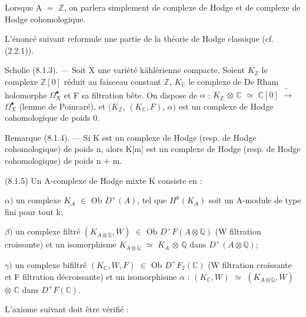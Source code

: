 \documentclass[11pt,twoside]{article}
\begin{document}
Lorsque A \(=\) \(\mathbb{Z}\), on parlera simplement de complexe de Hodge et de complexe de Hodge cohomologique.\par
\par\medskip
L’énoncé suivant reformule une partie de la théorie de Hodge classique (cf. (2.2.1)).\par
\par\medskip
Scholie (8.1.3). — Soit X une variété kählérienne compacte. Soient \(K_{\mathbb{Z}}\) le complexe \(\mathbb{Z}[0]\) réduit au faisceau constant \(\mathbb{Z}\), \(K_{\mathbb{C}}\) le complexe de De Rham holomorphe \(\Omega _{X}^{\bullet }\) et F sa filtration bête. On dispose de \(\alpha \) : \(K_{\mathbb{Z}}\) \(\otimes \) \(\mathbb{C}\) \(\simeq \) \(\mathbb{C}[0]\) \(\widetilde{\to }\) \(\Omega _{X}^{\bullet }\) (lemme de Poincaré), et \((K_{\mathbb{Z}}\), \((K_{\mathbb{C}},F)\), \(\alpha )\) est un complexe de Hodge cohomologique de poids 0.\par
\par\medskip
Remarque (8.1.4). — Si K est un complexe de Hodge (resp. de Hodge cohomologique) de poids n, alors K[m] est un complexe de Hodge (resp. de Hodge cohomologique) de poids n \(+\) m.\par
\par\medskip
(8.1.5) Un A-complexe de Hodge mixte K consiste en :\par
\par\medskip
\(\alpha )\) un complexe \(K_{A}\) \(\in \) Ob \(D^{+}(A)\), tel que \(H^{k}(K_{A})\) soit un A-module de type fini pour tout k;\par
\par\medskip
\(\beta )\) un complexe filtré \((K_{A\otimes \mathbb{Q}},W)\) \(\in \) Ob \(D^{+}F(A\otimes \mathbb{Q})\) (W filtration croissante) et un isomorphisme \(K_{A\otimes \mathbb{Q}}\) \(\simeq \) \(K_{A}\) \(\otimes \) \(\mathbb{Q}\) dans \(D^{+}(A\otimes \mathbb{Q})\);\par
\par\medskip
\(\gamma )\) un complexe bifiltré \((K_{\mathbb{C}},W,F)\) \(\in \) Ob \(D^{+}F_{2}(\mathbb{C})\) (W filtration croissante et F filtration décroissante) et un isomorphisme \(\alpha \) : \((K_{\mathbb{C}},W)\) \(\simeq \) \((K_{A\otimes \mathbb{Q}},W)\) \(\otimes \) \(\mathbb{C}\) dans \(D^{+}F(\mathbb{C})\).\par
\par\medskip
L’axiome suivant doit être vérifié :\par
\par\medskip
\end{document}
